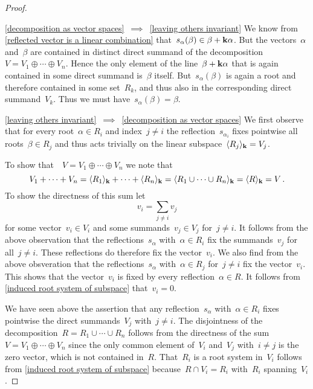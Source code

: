 \begin{proof}
  \leavevmode
  \begin{implicationlist}
    \item[\ref*{decomposition as vector spaces}~$\implies$~\ref*{leaving others invariant}]
      We know from \cref{reflected vector is a linear combination} that~$s_\alpha(\beta) \in \beta + \mathbf{k} \alpha$.
      But the vectors~$\alpha$ and~$\beta$ are contained in distinct direct summand of the decomposition~$V = V_1 \oplus \dotsb \oplus V_n$.
      Hence the only element of the line~$\beta + \mathbf{k} \alpha$ that is again contained in some direct summand is~$\beta$ itself.
      But~$s_\alpha(\beta)$ is again a root and therefore contained in some set~$R_k$, and thus also in the corresponding direct summand~$V_k$.
      Thus we must have~$s_\alpha(\beta) = \beta$.
    \item[\ref*{leaving others invariant}~$\implies$~\ref*{decomposition as vector spaces}]
      We first observe that for every root~$\alpha \in R_i$ and index~$j \neq i$ the reflection~$s_{\alpha_i}$ fixes pointwise all roots~$\beta \in R_j$ and thus acts trivially on the linear subspace~$\langle R_j\rangle_{\mathbf{k}} = V_j$.

      To show that~~$V = V_1 \oplus \dotsb \oplus V_n$ we note that
      \[
        V_1 + \dotsb + V_n
        =
        \langle R_1\rangle_{\mathbf{k}} + \dotsb + \langle R_n\rangle_{\mathbf{k}}
        =
        \langle R_1 \cup \dotsb \cup R_n\rangle_{\mathbf{k}}
        =
        \langle R\rangle_{\mathbf{k}}
        =
        V \,.
      \]
      To show the directness of this sum let
      \[
        v_i = \sum_{j \neq i} v_j 
      \]
      for some vector~$v_i \in V_i$ and some summands~$v_j \in V_j$ for~$j \neq i$.
      It follows from the above observation that the reflections~$s_\alpha$ with~$\alpha \in R_i$ fix the summands~$v_j$ for all~$j \neq i$.
      These reflections do therefore fix the vector~$v_i$.
      We also find from the above obsveration that the reflections~$s_\alpha$ with~$\alpha \in R_j$ for~$j \neq i$ fix the vector~$v_i$.
      This shows that the vector~$v_i$ is fixed by every reflection~$\alpha \in R$.
      It follows from \cref{induced root system of subspace} that~$v_i = 0$.
  \end{implicationlist}
  
  We have seen above the assertion that any reflection~$s_\alpha$ with~$\alpha \in R_i$ fixes pointwise the direct summands~$V_j$ with~$j \neq i$.
  The disjointness of the decomposition~$R = R_1 \cup \dotsb \cup R_n$ follows from the directness of the sum~$V = V_1 \oplus \dotsb \oplus V_n$ since the only common element of~$V_i$ and~$V_j$ with~$i \neq j$ is the zero vector, which is not contained in~$R$.
  That~$R_i$ is a root system in~$V_i$ follows from \cref{induced root system of subspace} because~$R \cap V_i = R_i$ with~$R_i$ spanning~$V_i$.
\end{proof}


